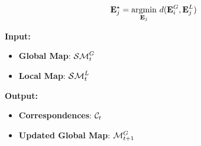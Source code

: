 \documentclass{article}
\begin{document}
	\begin{equation}
	\mathbf{E}_j^\star = \operatorname*{argmin}_{\mathbf{E}_j} \, d(\mathbf{E}_i^G,\mathbf{E}_j^L)
	\end{equation}
	
	

	{\bf Input: }
	\begin{itemize}
		\item {\bf Global Map}: $\mathcal{SM}^G_t$
		\item {\bf Local Map}: $\mathcal{SM}^L_t$
	\end{itemize}
	\noindent
	{\bf Output: }
	\begin{itemize}
		\item {\bf Correspondences}: $\mathcal{C}_t$	
		\item {\bf Updated Global Map}: $\mathcal{M}_{t+1}^G$	
	\end{itemize}
	

	\clearpage	
	
	
	
\end{document}
